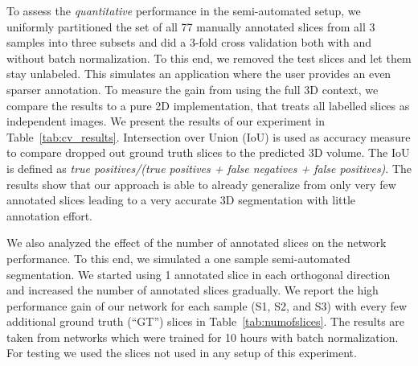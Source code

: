 \documentclass[runningheads,a4paper]{llncs}
\begin{document}
To assess the \textit{quantitative} performance in the semi-automated setup, we uniformly partitioned the set of all 77 manually annotated slices from all 3 samples into three subsets and did a 3-fold cross validation both with and without batch normalization. To this end, we removed the test slices and let them stay unlabeled. This simulates an application where the user provides an even sparser annotation. To measure the gain from using the full 3D context, we compare the results to a pure 2D implementation, that treats all labelled slices as independent images. We present the results of our experiment in Table~\ref{tab:cv_results}. Intersection over Union (IoU) is used as accuracy measure to compare dropped out ground truth slices to the predicted 3D volume. The IoU is defined as \textit{true positives/(true positives + false negatives + false positives)}. The results show that our approach is able to already generalize from only very few annotated slices leading to a very accurate 3D segmentation with little annotation effort.

We also analyzed the effect of the number of annotated slices on the network performance. To this end, we simulated a one sample semi-automated segmentation. We started using 1 annotated slice in each orthogonal direction and increased the number of annotated slices gradually. We report the high performance gain of our network for each sample (S1, S2, and S3) with every few additional ground truth (``GT'') slices in Table~\ref{tab:numofslices}. The results are taken from networks which were trained for 10 hours with batch normalization. For testing we used the slices not used in any setup of this experiment.
\end{document}

